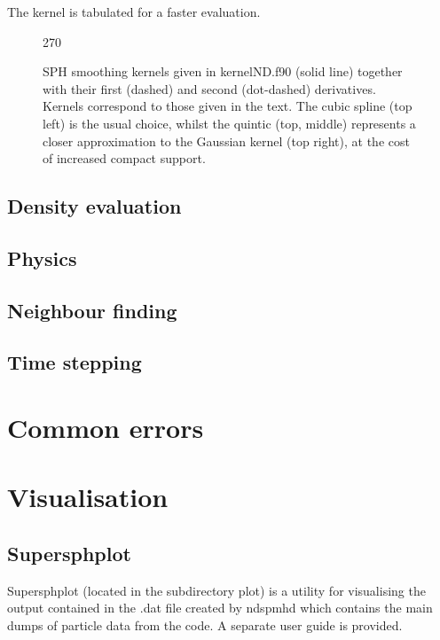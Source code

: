 \documentclass[a4paper,12pt]{article}
\begin{document}
 The kernel is tabulated for a faster evaluation. 

\begin{figure}[h]
\begin{center}
\begin{turn}{270}\end{turn}
\caption{SPH smoothing kernels given in kernelND.f90 (solid
line) together with their first (dashed) and second (dot-dashed) derivatives. Kernels
correspond to those given in the text. The cubic spline (top left) is the usual
choice, whilst the quintic (top, middle) represents a closer approximation to the Gaussian
kernel (top right), at the cost of increased compact support.}
\label{fig:kernels}
\end{center}
\end{figure}

\subsection{Density evaluation}

\subsection{Physics}

\subsection{Neighbour finding}

\subsection{Time stepping}

\section{Common errors}

\section{Visualisation}

\subsection{Supersphplot}
 Supersphplot (located in the subdirectory plot) is a utility for visualising
the output contained in the .dat file created by ndspmhd which contains the main
dumps of particle data from the code. A separate user guide is provided.
\end{document}
